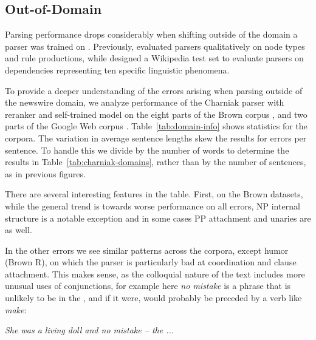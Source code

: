 \subsection{Out-of-Domain}

Parsing performance drops considerably when shifting outside of the domain a
parser was trained on \parencite{Gildea:2001}.
Previously, \textcite{Clegg:2005:EIT:1626315.1626317} evaluated parsers qualitatively on
node types and rule productions, while  \textcite{Bender:2011:PEO:2145432.2145479}
designed a Wikipedia test set to evaluate parsers on dependencies representing
ten specific linguistic phenomena.

To provide a deeper understanding of the errors arising when parsing outside of
the newswire domain, we analyze performance of the Charniak parser with
reranker and self-trained model on the eight parts of the Brown corpus
\parencite{ptb}, and two parts of the Google Web
corpus \parencite{Petrov:2012}.  Table~\ref{tab:domain-info} shows statistics for
the corpora.  The variation in average sentence lengths skew the results for
errors per sentence.  To handle this we divide by the number of words to
determine the results in Table~\ref{tab:charniak-domains}, rather than by the
number of sentences, as in previous figures.

There are several interesting features in the table.  First, on the Brown
datasets, while the general trend is towards worse performance on all errors,
NP internal structure is a notable exception and in some cases PP attachment
and unaries are as well.

In the other errors we see similar patterns across the corpora, except humor
(Brown R), on which the parser is particularly bad at coordination and clause
attachment.  This makes sense, as the colloquial nature of the text includes
more unusual uses of conjunctions, for example here \emph{no mistake} is a phrase that is unlikely to be in the \wsj, and if it were, would probably be preceded by a verb like \emph{make}:

\vspace{3mm}
\emph{She was a living doll and no mistake -- the ... }
\vspace{3mm}

\begin{landscape}

\end{landscape}

